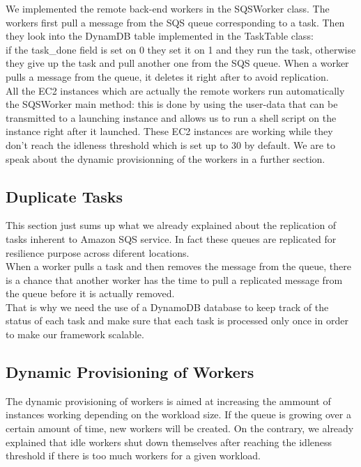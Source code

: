 \documentclass{article}
\begin{document}
We implemented the remote back-end workers in the SQSWorker class. The workers first pull a message from the SQS queue corresponding to a task. Then they look into the DynamDB table implemented in the TaskTable class:\\

if the task\_done field is set on 0 they set it on 1 and they run the task, otherwise they give up the task and pull another one from the SQS queue. When a worker pulls a message from the queue, it deletes it right after to avoid replication.\\

All the EC2 instances which are actually the remote workers run automatically the SQSWorker main method: this is done by using the user-data that can be transmitted to a launching instance and allows us to run a shell script on the instance right after it launched. These EC2 instances are working while they don't reach the idleness threshold which is set up to 30 by default. We are to speak about the dynamic provisionning of the workers in a further section.

\subsection{Duplicate Tasks}
This section just sums up what we already explained about the replication of tasks inherent to Amazon SQS service. In fact these queues are replicated for resilience purpose across diferent locations.\\ 

When a worker pulls a task and then removes the message from the queue, there is a chance that another worker has the time to pull a replicated message from the queue before it is actually removed. \\

That is why we need the use of a DynamoDB database to keep track of the status of each task and make sure that each task is processed only once in order to make our framework scalable.\\

\subsection{Dynamic Provisioning of Workers}
The dynamic provisioning of workers is aimed at increasing the ammount of instances working depending on the workload size. If the queue is growing over a certain amount of time, new workers will be created. On the contrary, we already explained that idle workers shut down themselves after reaching the idleness threshold if there is too much workers for a given workload.\\
\end{document}
